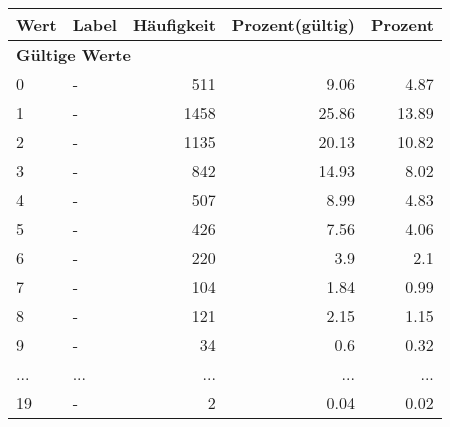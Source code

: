      \begin{longtable}{lXrrr}
     \toprule
     \textbf{Wert} & \textbf{Label} & \textbf{Häufigkeit} & \textbf{Prozent(gültig)} & \textbf{Prozent} \\
     \endhead
     \midrule
     \multicolumn{5}{l}{\textbf{Gültige Werte}}\\
        0 & \multicolumn{1}{X}{-} & %
          \num{511} &
          \num[round-mode=places,round-precision=2]{9,06} &
          \num[round-mode=places,round-precision=2]{4,87} \\
        1 & \multicolumn{1}{X}{-} & %
          \num{1458} &
          \num[round-mode=places,round-precision=2]{25,86} &
          \num[round-mode=places,round-precision=2]{13,89} \\
        2 & \multicolumn{1}{X}{-} & %
          \num{1135} &
          \num[round-mode=places,round-precision=2]{20,13} &
          \num[round-mode=places,round-precision=2]{10,82} \\
        3 & \multicolumn{1}{X}{-} & %
          \num{842} &
          \num[round-mode=places,round-precision=2]{14,93} &
          \num[round-mode=places,round-precision=2]{8,02} \\
        4 & \multicolumn{1}{X}{-} & %
          \num{507} &
          \num[round-mode=places,round-precision=2]{8,99} &
          \num[round-mode=places,round-precision=2]{4,83} \\
        5 & \multicolumn{1}{X}{-} & %
          \num{426} &
          \num[round-mode=places,round-precision=2]{7,56} &
          \num[round-mode=places,round-precision=2]{4,06} \\
        6 & \multicolumn{1}{X}{-} & %
          \num{220} &
          \num[round-mode=places,round-precision=2]{3,9} &
          \num[round-mode=places,round-precision=2]{2,1} \\
        7 & \multicolumn{1}{X}{-} & %
          \num{104} &
          \num[round-mode=places,round-precision=2]{1,84} &
          \num[round-mode=places,round-precision=2]{0,99} \\
        8 & \multicolumn{1}{X}{-} & %
          \num{121} &
          \num[round-mode=places,round-precision=2]{2,15} &
          \num[round-mode=places,round-precision=2]{1,15} \\
        9 & \multicolumn{1}{X}{-} & %
          \num{34} &
          \num[round-mode=places,round-precision=2]{0,6} &
          \num[round-mode=places,round-precision=2]{0,32} \\
       ... & ... & ... & ... & ... \\
        19 & \multicolumn{1}{X}{-} & %
          \num{2} &
          \num[round-mode=places,round-precision=2]{0,04} &
          \num[round-mode=places,round-precision=2]{0,02} \\


\end{longtable}
